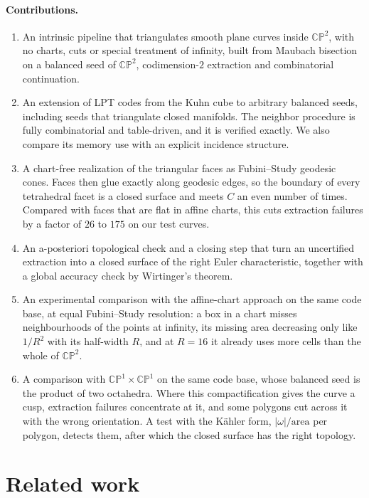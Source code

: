 \documentclass[11pt]{article}
\theoremstyle{plain}
\theoremstyle{definition}
\theoremstyle{remark}
\newcommand{\CP}{\mathbb{CP}}
\begin{document}
\paragraph{Contributions.}
\begin{enumerate}[itemsep=2pt]
\item An intrinsic pipeline that triangulates smooth plane curves inside
  $\CP^2$, with no charts, cuts or special treatment of infinity, built
  from Maubach bisection on a balanced seed of $\CP^2$, codimension-$2$
  extraction and combinatorial continuation.
\item An extension of LPT codes from the Kuhn cube to arbitrary balanced
  seeds, including seeds that triangulate closed manifolds. The neighbor
  procedure is fully combinatorial and table-driven, and it is verified
  exactly. We also compare its memory use with an explicit incidence
  structure.
\item A chart-free realization of the triangular faces as Fubini--Study
  geodesic cones. Faces then glue exactly along geodesic edges, so the
  boundary of every tetrahedral facet is a closed surface and meets $C$ an
  even number of times. Compared with faces that are flat in affine
  charts, this cuts extraction failures by a factor of $26$ to $175$ on our
  test curves.
\item An a-posteriori topological check and a closing step that turn an
  uncertified extraction into a closed surface of the right Euler
  characteristic, together with a global accuracy check by Wirtinger's
  theorem.
\item An experimental comparison with the affine-chart approach on the
  same code base, at equal Fubini--Study resolution: a box in a chart
  misses neighbourhoods of the points at infinity, its missing area
  decreasing only like $1/R^2$ with its half-width $R$, and at $R=16$ it
  already uses more cells than the whole of $\CP^2$.
\item A comparison with $\CP^1\times\CP^1$ on the same code base, whose
  balanced seed is the product of two octahedra. Where this
  compactification gives the curve a cusp, extraction failures concentrate
  at it, and some polygons cut across it with the wrong orientation. A
  test with the Kähler form, $|\omega|/\mathrm{area}$ per polygon, detects
  them, after which the closed surface has the right topology.
\end{enumerate}

\section{Related work}
\label{sec:related}
\end{document}
